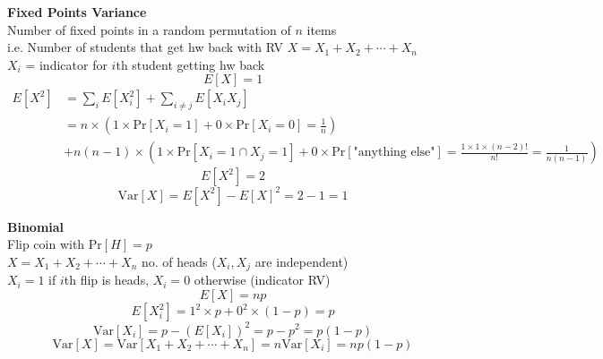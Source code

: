 \documentclass{article}\usepackage{amsmath,amssymb,amsthm,tikz,tkz-graph,color,chngpage,soul,hyperref,csquotes,graphicx,floatrow,listings, mathrsfs,framed,scrextend}\newcommand*{\QEDB}{\hfill\ensuremath{\square}}\newtheorem*{prop}{Proposition}\renewcommand{\theenumi}{\alph{enumi}}\usepackage[shortlabels]{enumitem}\usepackage[nobreak=true]{mdframed}\usetikzlibrary{matrix,calc}\MakeOuterQuote{"}\usepackage[margin=0.75in]{geometry} \newtheorem{theorem}{Theorem}
\newcommand{\x}[1]{\textrm{#1}}
\newcommand{\pr}[1]{\textrm{Pr}[#1]}
\newcommand{\sumlim}[3]{\sum\limits_{#1}^{#2}#3}
\newcommand{\eq}[1]{\begin{equation}#1\end{equation}}
\newcommand{\eqx}[1]{\begin{equation*}#1\end{equation*}}
\newcommand{\eqs}[1]{\begin{mdframed}#1\end{mdframed}}
\newcommand{\E}[1]{E[#1]}
\newcommand{\var}[1]{\x{Var}[#1]}
\begin{document}
\eqs{
\textbf{Fixed Points Variance}\\
Number of fixed points in a random permutation of $n$ items\\
i.e. Number of students that get hw back with RV $X=X_1+X_2+\cdots+X_n$\\
$X_i$ = indicator for $i$th student getting hw back
\eq{\E{X}=1}
\begin{align*}
\E{X^2}&=\sumlim{i}{}{\E{X_i^2}}+\sumlim{i\ne j}{}{\E{X_iX_j}}\\
&=n\times(1\times\pr{X_i=1}+0\times\pr{X_i=0}=\frac{1}{n})\\
&+n(n-1)\times(1\times\pr{X_i=1\cap X_j=1}+0\times\pr{\x{"anything else"}}
=\frac{1\times1\times(n-2)!}{n!}=\frac{1}{n(n-1)})
\end{align*}
\eq{\E{X^2}=2}
\eq{\var{X}=\E{X^2}-\E{X}^2=2-1=1}
}
\eqs{
\textbf{Binomial}\\
Flip coin with $\pr{H}=p$\\
$X=X_1+X_2+\cdots+X_n$ no. of heads ($X_i,X_j$ are independent)\\
$X_i=1$ if $i$th flip is heads, $X_i=0$ otherwise (indicator RV)
\eq{\E{X}=np}
\eqx{\E{X_i^2}=1^2\times p + 0^2\times(1-p)=p}
\eqx{\var{X_i}=p-(\E{X_i})^2=p-p^2=p(1-p)}
\eq{\var{X}=\var{X_1+X_2+\cdots+X_n}=n\var{X_i}=np(1-p)}
}
\end{document}
